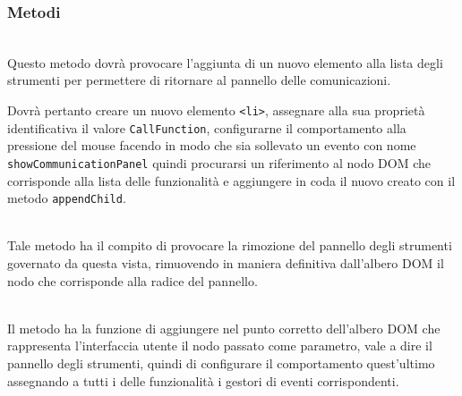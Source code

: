 \subsubsection*{Metodi}
\begin{description}

  \item{}\\
  Questo metodo dovrà provocare l'aggiunta di un nuovo elemento alla lista degli strumenti per permettere di ritornare al pannello delle comunicazioni.
  
  Dovrà pertanto creare un nuovo elemento \verb'<li>', assegnare alla sua proprietà identificativa il valore \verb'CallFunction', configurarne il comportamento alla pressione del mouse facendo in modo che sia sollevato un evento con nome \verb'showCommunicationPanel' quindi procurarsi un riferimento al nodo DOM che corrisponde alla lista delle funzionalità e aggiungere in coda il nuovo  creato con il metodo \verb'appendChild'.
  
  \item{}\\
  Tale metodo ha il compito di provocare la rimozione del pannello degli strumenti governato da questa vista, rimuovendo in maniera definitiva dall'albero DOM il nodo che corrisponde alla radice del pannello.
  
  \item{}\\
  Il metodo ha la funzione di aggiungere nel punto corretto dell'albero DOM che rappresenta l'interfaccia utente il nodo passato come parametro, vale a dire il pannello degli strumenti, quindi di configurare il comportamento quest'ultimo assegnando a tutti i  delle funzionalità i gestori di eventi corrispondenti.
  

\end{description}
